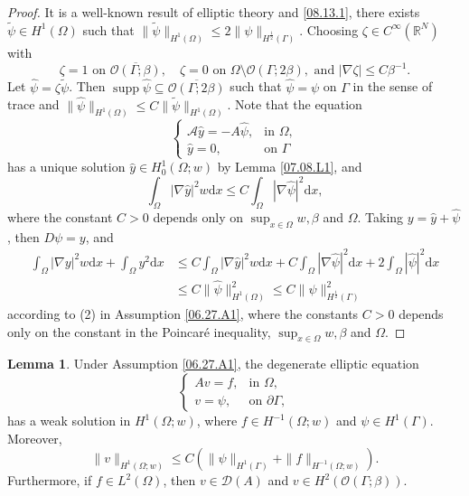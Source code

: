 \documentclass[preprint,12pt]{elsarticle}
\theoremstyle{definition}   %
\newtheorem{lemma}[theorem]{Lemma}
\numberwithin{equation}{section}
\def\pt{\partial}
\def\s{\subseteq}
\def\ol{\overline}
\def\pt{\partial}
\def\Om{\Omega}
\def\be{\beta}
\def\Ga{\Gamma}
\def\iy{\infty}
\def\f{\frac}
\def\se{\setminus}
\def\df{\mathrm d}
\def\wt{\widetilde}
\def\wh{\widehat}
\def\mcO{\mathcal{O}}
\def\mcA{\mathcal{A}}
\def\mcD{\mathcal{D}}
\DeclareMathOperator{\supp}{{supp}}
\newcommand{\R}{\mathbb R}
\begin{document}
\begin{proof} 
	It is a well-known result of elliptic theory and  \eqref{08.13.1}, there exists $\wt \psi\in H^1(\Om)$ such that $\|\wt \psi\|_{H^1(\Om)}\leq 2\|\psi\|_{H^\f{1}{2}(\Ga)}$. Choosing $\zeta\in C^\iy(\R^N)$ with 
	\begin{equation*}
		\zeta=1 \mbox{ on } \ol{\mcO(\Ga;\be)}, \quad \zeta=0 \mbox{ on } \Om\se \mcO(\Ga; 2\be), \mbox{ and } |\nabla \zeta|\leq C\be^{-1}. 
	\end{equation*} 
	Let $\wh \psi=\zeta \wt \psi$. Then  $\supp \wh \psi\s \ol{\mcO(\Ga; 2\be)}$ such that $\wh \psi=\psi$ on $\Ga$ in the sense of trace and $\|\wh \psi\|_{H^1(\Om)}\leq C\|\wt \psi\|_{H^1(\Om)}$. Note that  the equation 
	\begin{equation*}
		\begin{cases}
			\mcA \wh y=-A \wh \psi, &\mbox{in }\Om,\\
			\wh y=0, &\mbox{on }\Ga
		\end{cases}
	\end{equation*}
	has a unique solution $\wh y\in H_0^1(\Om;w)$ by Lemma \ref{07.08.L1}, and 
	\begin{equation*}
		\int_\Om |\nabla \wh y|^2w\df x\leq C\int_\Om |\nabla \wh \psi|^2\df x, 
	\end{equation*}
	where the constant $C>0$ depends only on $\sup_{x\in \Om}w, \be$ and $\Om$. 
	Taking $y=\wh y+\wh \psi$, then $D\psi=y$, and 
	\begin{equation}\label{08.15.1}
		\begin{split} 
			\int_\Om |\nabla y|^2w\df x+\int_\Om y^2\df x 
			&\leq C\int_\Om |\nabla \wh y|^2w\df x+C\int_\Om |\nabla \wh \psi|^2\df x+2\int_\Om |\wh \psi|^2\df x\\
			&\leq C\|\wh \psi\|_{H^1(\Om)}^2\leq C\|\psi\|_{H^\f{1}{2}(\Ga)}^2
		\end{split} 
	\end{equation}
	according to (2) in Assumption \ref{06.27.A1}, where the constants $C>0$ depends only on the constant in the Poincar\'e inequality, $\sup_{x\in \Om}w, \be$ and $\Om$. 
\end{proof}

\begin{lemma}\label{09.11.L1}
	Under Assumption \ref{06.27.A1}, the degenerate elliptic equation \begin{equation}\label{09.11.1}
		\begin{cases}
			Av=f, &\mbox{in }\Om,\\
			v=\psi, &\mbox{on }\pt\Ga, 
		\end{cases}
	\end{equation}
	has a weak solution in $H^1(\Om;w)$, where $f\in H^{-1}(\Om;w)$ and $\psi\in H^1(\Ga)$. Moreover,  
	\begin{equation}\label{09.12.4}
		\|v\|_{H^1(\Om;w)}\leq C\left(\|\psi\|_{H^1(\Ga)}+\|f\|_{H^{-1}(\Om;w)}\right). 
	\end{equation}
	Furthermore, if $f\in L^2(\Om)$, then  $v\in \mcD(A)$ and $v\in H^2(\mcO(\Ga;\be))$. 
\end{lemma}
\end{document}
